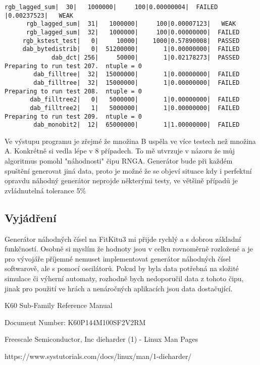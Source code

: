 \documentclass[a4paper]{article}
\begin{document}
\begin{Verbatim}[fontsize=\tiny]
      rgb_lagged_sum|  30|   1000000|     100|0.00000004|  FAILED          |0.00237523|   WEAK  
      rgb_lagged_sum|  31|   1000000|     100|0.00007123|   WEAK   
      rgb_lagged_sum|  32|   1000000|     100|0.00000000|  FAILED  
     rgb_kstest_test|   0|     10000|    1000|0.57890008|  PASSED  
     dab_bytedistrib|   0|  51200000|       1|0.00000000|  FAILED  
             dab_dct| 256|     50000|       1|0.02178273|  PASSED  
Preparing to run test 207.  ntuple = 0
        dab_filltree|  32|  15000000|       1|0.00000000|  FAILED  
        dab_filltree|  32|  15000000|       1|0.00000000|  FAILED  
Preparing to run test 208.  ntuple = 0
       dab_filltree2|   0|   5000000|       1|0.00000000|  FAILED  
       dab_filltree2|   1|   5000000|       1|0.00000000|  FAILED  
Preparing to run test 209.  ntuple = 0
        dab_monobit2|  12|  65000000|       1|1.00000000|  FAILED  
\end{Verbatim}

\vspace{1pc}
\noindent Ve výstupu programu je zřejmé že množina B uspěla ve více testech než množina A. Konkrétně si vedla lépe v 8 případech. To mě utvrzuje v názoru že můj algoritmus pomohl "náhodnosti" čipu RNGA.
\noindent Generátor bude při každém spuštění generovat jiná data, proto je možné že se objeví situace kdy i perfektní opravdu náhodný generátor neprojde některými testy, ve většině případů je zvládnutelná tolerance 5\%\cite{dieharder}
\subsection{Vyjádření}
Generátor náhodných čísel na FitKitu3 mi přijde rychlý a s dobrou základní funkčností. Osobně si myslím že hodnoty jsou v celku rovnoměrně rozložené a je pro vývojáře příjemné nemuset implementovat generátor náhodných čísel softwarově, ale s pomocí oscilátorů. Pokud by byla data potřebná na složité simulace či výherní automaty, rozhodně bych nedoporučil data z tohoto čipu, jinak pro použití ve hrách a nenáročných aplikacích jsou data dostačující.

\begin{thebibliography}{9}

K60 Sub-Family Reference Manual 

Document Number: K60P144M100SF2V2RM

Freescale Semiconductor, Inc
dieharder (1) - Linux Man Pages


https://www.systutorials.com/docs/linux/man/1-dieharder/

\end{thebibliography}
\end{document}

